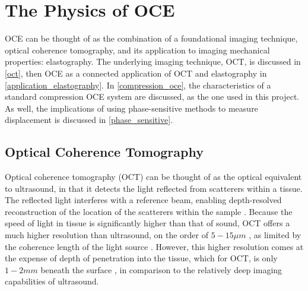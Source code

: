 \chapter{The Physics of OCE}\label{oce}

OCE can be thought of as the combination of a foundational imaging technique, optical coherence tomography, and its application to imaging mechanical properties: elastography. The underlying imaging technique, OCT, is discussed in \autoref{oct}, then OCE as a connected application of OCT and elastography in \autoref{application_elastography}. In \autoref{compression_oce}, the characteristics of a standard compression OCE system are discussed, as the one used in this project. As well, the implications of using phase-sensitive methods to measure displacement is discussed in \autoref{phase_sensitive}.

\section{Optical Coherence Tomography}\label{oct}
Optical coherence tomography (OCT) can be thought of as the optical equivalent to ultrasound, in that it detects the light reflected from scatterers within a tissue. The reflected light interferes with a reference beam, enabling depth-resolved reconstruction of the location of the scatterers within the sample \cite{chin_parametric_2016}. Because the speed of light in tissue is significantly higher than that of sound, OCT offers a much higher resolution than ultrasound, on the order of $5-15 \mu m$ \cite{kennedy_emergence_2017}, as limited by the coherence length of the light source \cite{huang_optical_1991}. However, this higher resolution comes at the expense of depth of penetration into the tissue, which for OCT, is only $1-2mm$ beneath the surface \cite{schmitt_optical_1999}, in comparison to the relatively deep imaging capabilities of ultrasound.

